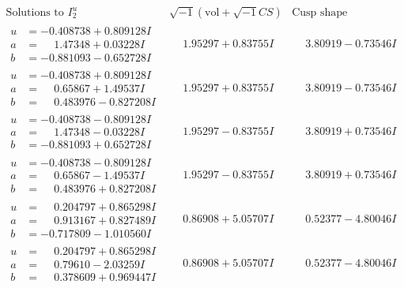 \documentclass[1p]{elsarticle_modified}
\theoremstyle{definition}
\newcommand{\I}{\sqrt{-1}}
\begin{document}
$$\begin{array}{c|c|c}  
\text{Solutions to }I^u_{2}& \I (\text{vol} + \sqrt{-1}CS) & \text{Cusp shape}\\
 \hline 
\begin{aligned}
u &= -0.408738 + 0.809128 I \\
a &= \phantom{-}1.47348 + 0.03228 I \\
b &= -0.881093 - 0.652728 I\end{aligned}
 & \phantom{-}1.95297 + 0.83755 I & \phantom{-}3.80919 - 0.73546 I \\ \hline\begin{aligned}
u &= -0.408738 + 0.809128 I \\
a &= \phantom{-}0.65867 + 1.49537 I \\
b &= \phantom{-}0.483976 - 0.827208 I\end{aligned}
 & \phantom{-}1.95297 + 0.83755 I & \phantom{-}3.80919 - 0.73546 I \\ \hline\begin{aligned}
u &= -0.408738 - 0.809128 I \\
a &= \phantom{-}1.47348 - 0.03228 I \\
b &= -0.881093 + 0.652728 I\end{aligned}
 & \phantom{-}1.95297 - 0.83755 I & \phantom{-}3.80919 + 0.73546 I \\ \hline\begin{aligned}
u &= -0.408738 - 0.809128 I \\
a &= \phantom{-}0.65867 - 1.49537 I \\
b &= \phantom{-}0.483976 + 0.827208 I\end{aligned}
 & \phantom{-}1.95297 - 0.83755 I & \phantom{-}3.80919 + 0.73546 I \\ \hline\begin{aligned}
u &= \phantom{-}0.204797 + 0.865298 I \\
a &= \phantom{-}0.913167 + 0.827489 I \\
b &= -0.717809 - 1.010560 I\end{aligned}
 & \phantom{-}0.86908 + 5.05707 I & \phantom{-}0.52377 - 4.80046 I \\ \hline\begin{aligned}
u &= \phantom{-}0.204797 + 0.865298 I \\
a &= \phantom{-}0.79610 - 2.03259 I \\
b &= \phantom{-}0.378609 + 0.969447 I\end{aligned}
 & \phantom{-}0.86908 + 5.05707 I & \phantom{-}0.52377 - 4.80046 I \\ \hline\begin{aligned}

\end{aligned}
\end{array}$$
\end{document}
